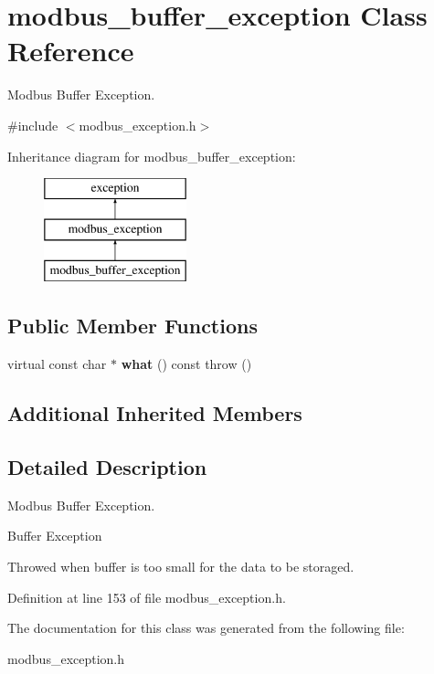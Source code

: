 \hypertarget{classmodbus__buffer__exception}{}\section{modbus\+\_\+buffer\+\_\+exception Class Reference}
\label{classmodbus__buffer__exception}


Modbus Buffer Exception.  




{\ttfamily \#include $<$modbus\+\_\+exception.\+h$>$}

Inheritance diagram for modbus\+\_\+buffer\+\_\+exception\+:\begin{figure}[H]
\begin{center}
\leavevmode
\includegraphics[height=3.000000cm]{classmodbus__buffer__exception}
\end{center}
\end{figure}
\subsection*{Public Member Functions}
\begin{DoxyCompactItemize}
\item 
\mbox{\label{classmodbus__buffer__exception_ab348b2a69d7ad31d0deff7e00ec9bf27}} 
virtual const char $\ast$ {\bfseries what} () const  throw ()
\end{DoxyCompactItemize}
\subsection*{Additional Inherited Members}


\subsection{Detailed Description}
Modbus Buffer Exception. 

Buffer Exception

Throwed when buffer is too small for the data to be storaged. 

Definition at line 153 of file modbus\+\_\+exception.\+h.



The documentation for this class was generated from the following file\+:\begin{DoxyCompactItemize}
\item 
modbus\+\_\+exception.\+h\end{DoxyCompactItemize}
